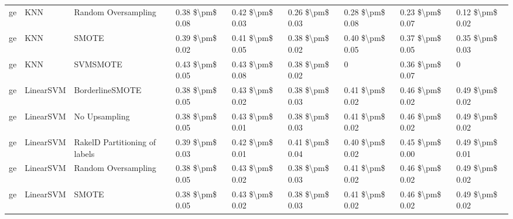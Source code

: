 \begin{tabular}{lllllllll}
      ge &                             KNN &           Random Oversampling & 0.38 \$\textbackslash pm\$ 0.08 &           0.42 \$\textbackslash pm\$ 0.03 &       0.26 \$\textbackslash pm\$ 0.03 &        0.28 \$\textbackslash pm\$ 0.08 &                         0.23 \$\textbackslash pm\$ 0.07 &     0.12 \$\textbackslash pm\$ 0.02 \\
      ge &                             KNN &                         SMOTE & 0.39 \$\textbackslash pm\$ 0.02 &           0.41 \$\textbackslash pm\$ 0.05 &       0.38 \$\textbackslash pm\$ 0.02 &        0.40 \$\textbackslash pm\$ 0.05 &                         0.37 \$\textbackslash pm\$ 0.05 &     0.35 \$\textbackslash pm\$ 0.03 \\
      ge &                             KNN &                      SVMSMOTE & 0.43 \$\textbackslash pm\$ 0.05 &           0.43 \$\textbackslash pm\$ 0.08 &       0.38 \$\textbackslash pm\$ 0.02 &                      0 &                         0.36 \$\textbackslash pm\$ 0.07 &                   0 \\
      ge &                       LinearSVM &               BorderlineSMOTE & 0.38 \$\textbackslash pm\$ 0.05 &           0.43 \$\textbackslash pm\$ 0.02 &       0.38 \$\textbackslash pm\$ 0.03 &        0.41 \$\textbackslash pm\$ 0.02 &                         0.46 \$\textbackslash pm\$ 0.02 &     0.49 \$\textbackslash pm\$ 0.02 \\
      ge &                       LinearSVM &                 No Upsampling & 0.38 \$\textbackslash pm\$ 0.05 &           0.43 \$\textbackslash pm\$ 0.01 &       0.38 \$\textbackslash pm\$ 0.03 &        0.41 \$\textbackslash pm\$ 0.02 &                         0.46 \$\textbackslash pm\$ 0.02 &     0.49 \$\textbackslash pm\$ 0.02 \\
      ge &                       LinearSVM & RakelD Partitioning of labels & 0.39 \$\textbackslash pm\$ 0.03 &           0.42 \$\textbackslash pm\$ 0.01 &       0.41 \$\textbackslash pm\$ 0.04 &        0.40 \$\textbackslash pm\$ 0.02 &                         0.45 \$\textbackslash pm\$ 0.00 &     0.49 \$\textbackslash pm\$ 0.01 \\
      ge &                       LinearSVM &           Random Oversampling & 0.38 \$\textbackslash pm\$ 0.05 &           0.43 \$\textbackslash pm\$ 0.02 &       0.38 \$\textbackslash pm\$ 0.03 &        0.41 \$\textbackslash pm\$ 0.02 &                         0.46 \$\textbackslash pm\$ 0.02 &     0.49 \$\textbackslash pm\$ 0.02 \\
      ge &                       LinearSVM &                         SMOTE & 0.38 \$\textbackslash pm\$ 0.05 &           0.43 \$\textbackslash pm\$ 0.02 &       0.38 \$\textbackslash pm\$ 0.03 &        0.41 \$\textbackslash pm\$ 0.02 &                         0.46 \$\textbackslash pm\$ 0.02 &     0.49 \$\textbackslash pm\$ 0.02 \\

\end{tabular}
